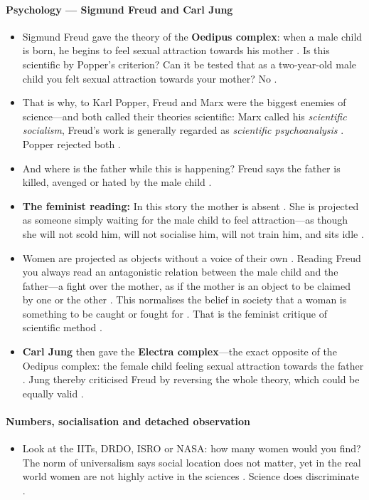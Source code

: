 \paragraph{Psychology --- Sigmund Freud and Carl Jung}
\begin{itemize}
    \item Sigmund Freud gave the theory of the \textbf{Oedipus complex}: when a male child is born, he begins to feel sexual attraction towards his mother . Is this scientific by Popper's criterion? Can it be tested that as a two-year-old male child you felt sexual attraction towards your mother? No .
\end{itemize}

\begin{CriticalPoint}
\begin{itemize}
    \item That is why, to Karl Popper, Freud and Marx were the biggest enemies of science---and both called their theories scientific: Marx called his \textit{scientific socialism}, Freud's work is generally regarded as \textit{scientific psychoanalysis} . Popper rejected both .
    \item And where is the father while this is happening? Freud says the father is killed, avenged or hated by the male child .
    \item \textbf{The feminist reading:} In this story the mother is absent . She is projected as someone simply waiting for the male child to feel attraction---as though she will not scold him, will not socialise him, will not train him, and sits idle .
    \item Women are projected as objects without a voice of their own . Reading Freud you always read an antagonistic relation between the male child and the father---a fight over the mother, as if the mother is an object to be claimed by one or the other . This normalises the belief in society that a woman is something to be caught or fought for . That is the feminist critique of scientific method .
    \item \textbf{Carl Jung} then gave the \textbf{Electra complex}---the exact opposite of the Oedipus complex: the female child feeling sexual attraction towards the father . Jung thereby criticised Freud by reversing the whole theory, which could be equally valid .
\end{itemize}
\end{CriticalPoint}

\paragraph{Numbers, socialisation and detached observation}
\begin{itemize}
    \item Look at the IITs, DRDO, ISRO or NASA: how many women would you find? The norm of universalism says social location does not matter, yet in the real world women are not highly active in the sciences . Science does discriminate .
\end{itemize}

